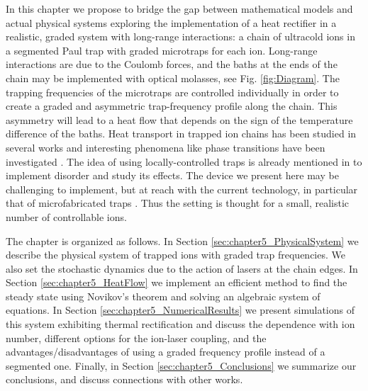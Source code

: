 In this chapter we propose to bridge the gap between mathematical models and actual physical systems
exploring the implementation of a heat rectifier in a realistic, graded system with long-range interactions:
a chain of ultracold ions in a segmented Paul trap with graded microtraps for each ion. Long-range interactions are due to the Coulomb forces, and the  baths at the ends of the chain  may be implemented with optical molasses,
see Fig. \ref{fig:Diagram}. The trapping frequencies of the  microtraps are controlled individually in order to create a graded and asymmetric trap-frequency profile along the chain. This asymmetry will lead to a heat flow that depends on the sign of the temperature difference of the baths. Heat transport in trapped ion chains has been studied in several works  \cite{Freitas2015,Ruiz2014,Ruiz2019,Pruttivarasin2011,Ramm2014} and interesting phenomena like phase transitions have been investigated \cite{Freitas2015,Ruiz2014,Ruiz2019,Pruttivarasin2011}. The idea of using locally-controlled traps is already mentioned in \cite{Freitas2015} to implement disorder and study its effects. The device we present here may be challenging to implement, but at reach with the current technology, in particular  that of microfabricated traps \cite{Cirac2000,Krauth2014,Schmied2009}. Thus the setting is thought for a small, realistic number of controllable ions.

The chapter is organized as follows. In Section \ref{sec:chapter5_PhysicalSystem} we describe the physical system of trapped ions with graded trap frequencies. We also set the stochastic dynamics due to the action of lasers at the chain edges.
In Section \ref{sec:chapter5_HeatFlow}  we implement an efficient  method to find the steady state using Novikov's theorem and solving an algebraic system of equations. In Section \ref{sec:chapter5_NumericalResults} we present simulations of this system exhibiting thermal rectification and discuss the dependence with ion number, different options for the ion-laser coupling, and the advantages/disadvantages of using a graded frequency profile instead of a segmented one. Finally, in Section \ref{sec:chapter5_Conclusions} we summarize our conclusions, and discuss connections with other works.
%
%
%
